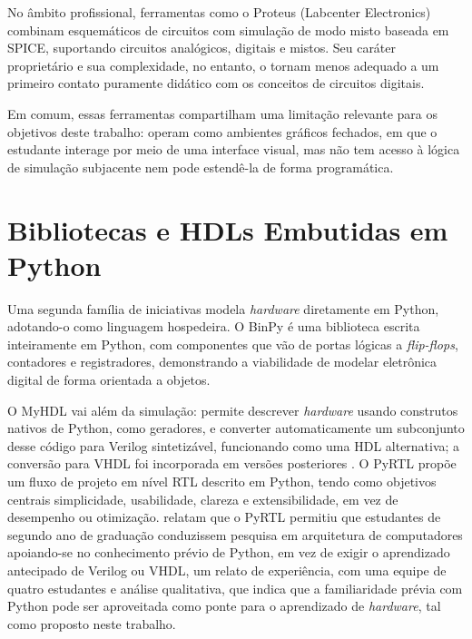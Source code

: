 No âmbito profissional, ferramentas como o Proteus \cite{labcenter2026} (Labcenter Electronics) combinam esquemáticos de circuitos com simulação de modo misto baseada em SPICE, suportando circuitos analógicos, digitais e mistos. Seu caráter proprietário e sua complexidade, no entanto, o tornam menos adequado a um primeiro contato puramente didático com os conceitos de circuitos digitais.

Em comum, essas ferramentas compartilham uma limitação relevante para os objetivos deste trabalho: operam como ambientes gráficos fechados, em que o estudante interage por meio de uma interface visual, mas não tem acesso à lógica de simulação subjacente nem pode estendê-la de forma programática.

\section{Bibliotecas e HDLs Embutidas em Python}
\label{sec:hdls-python}

Uma segunda família de iniciativas modela \textit{hardware} diretamente em Python, adotando-o como linguagem hospedeira. O BinPy \cite{binpy} é uma biblioteca escrita inteiramente em Python, com componentes que vão de portas lógicas a \textit{flip-flops}, contadores e registradores, demonstrando a viabilidade de modelar eletrônica digital de forma orientada a objetos.

O MyHDL \cite{decaluwe2004} vai além da simulação: permite descrever \textit{hardware} usando construtos nativos de Python, como geradores, e converter automaticamente um subconjunto desse código para Verilog sintetizável, funcionando como uma HDL alternativa; a conversão para VHDL foi incorporada em versões posteriores \cite{myhdl06}. O PyRTL \cite{clow2017} propõe um fluxo de projeto em nível RTL descrito em Python, tendo como objetivos centrais simplicidade, usabilidade, clareza e extensibilidade, em vez de desempenho ou otimização.  relatam que o PyRTL permitiu que estudantes de segundo ano de graduação conduzissem pesquisa em arquitetura de computadores apoiando-se no conhecimento prévio de Python, em vez de exigir o aprendizado antecipado de Verilog ou VHDL, um relato de experiência, com uma equipe de quatro estudantes e análise qualitativa, que indica que a familiaridade prévia com Python pode ser aproveitada como ponte para o aprendizado de \textit{hardware}, tal como proposto neste trabalho.

